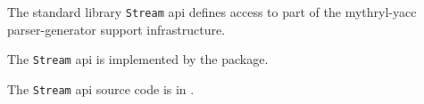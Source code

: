 
The standard library {\tt Stream} api defines access to part of the mythryl-yacc parser-generator support infrastructure.

The {\tt Stream} api is implemented by the  package.

The {\tt Stream} api source code is in .







